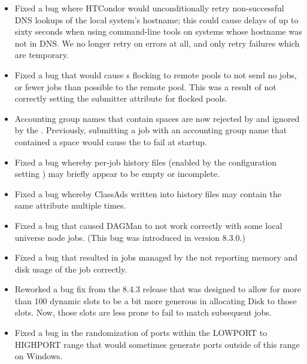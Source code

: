 \begin{itemize}

\item Fixed a bug where HTCondor would unconditionally retry non-successful
DNS lookups of the local system's hostname; this could cause delays of up
to sixty seconds when using command-line tools on systems whose hostname
was not in DNS.  We no longer retry on errors at all, and only retry
failures which are temporary.

\item Fixed a bug that would cause s flocking to remote
pools to not send no jobs, or fewer jobs than possible to the
remote pool. This was a result of not correctly setting
the submitter attribute  for
flocked pools.

\item Accounting group names that contain spaces are now rejected by
 and ignored by the .
Previously, submitting a job with an accounting group name that contained
a space would cause the  to fail at startup.

\item Fixed a bug whereby per-job history files (enabled by
the configuration setting ) may briefly
appear to be empty or incomplete.

\item Fixed a bug whereby ClassAds written into history files
may contain the same attribute multiple times.

\item Fixed a bug that caused DAGMan to not work correctly with
some local universe node jobs.  (This bug was introduced in version
8.3.0.)

\item Fixed a bug that resulted in jobs managed by the 
not reporting memory and disk usage of the job correctly.

\item Reworked a bug fix from the 8.4.3 release that was designed to allow for
more than 100 dynamic slots to be a bit more generous in allocating Disk to
those slots.
Now, those slots are less prone to fail to match subsequent jobs.

\item Fixed a bug in the randomization of ports within the LOWPORT to HIGHPORT range
that would sometimes generate ports outside of this range on Windows.


\end{itemize}
